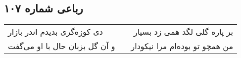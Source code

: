 \begin{center}
\section*{رباعی شماره ۱۰۷}
\label{sec:sh107}
\begin{longtable}{l p{0.5cm} r}
دی کوزه‌گری بدیدم اندر بازار
&&
بر پاره گلی لگد همی زد بسیار
\\
و آن گل بزبان حال با او می‌گفت
&&
من همچو تو بوده‌ام مرا نیکودار
\\
\end{longtable}
\end{center}
